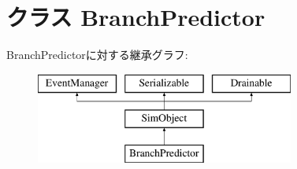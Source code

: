 \hypertarget{classBranchPredictor_1_1BranchPredictor}{
\section{クラス BranchPredictor}
\label{classBranchPredictor_1_1BranchPredictor}
}
BranchPredictorに対する継承グラフ:\begin{figure}[H]
\begin{center}
\leavevmode
\includegraphics[height=3cm]{classBranchPredictor_1_1BranchPredictor}
\end{center}
\end{figure}
